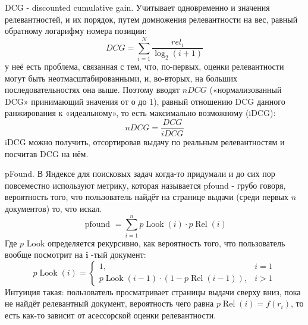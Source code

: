 DCG - discounted cumulative gain. Учитывает одновременно и значения релевантностей, и их порядок, путем домножения
релевантности на вес, равный обратному логарифму номера позиции:
$$
D C G=\sum_{i=1}^{N} \frac{r e l_{i}}{\log _{2}(i+1)}
$$
у неё есть проблема, связанная с тем, что, по-первых, оценки релевантности могут быть неотмасштабированными, и, во-вторых, на больших последовательностях она выше.
Поэтому вводят $n D C G$ («нормализованный DCG» принимающий значения от о до 1), равный отношению DCG данного
ранжирования к «идеальному», то есть максимально возможному (iDCG):
$$
n D C G=\frac{D C G}{i D C G}
$$
iDCG можно получить, отсортировав выдачу по реальным релевантностям и посчитав DCG на нём.

pFound. В Яндексе для поисковых задач когда-то придумали и до сих пор повсеместно используют метрику, которая называется pfound - грубо говоря, вероятность того, что пользователь найдёт на странице выдачи (среди первых $n$ документов) то, что искал.
$$
\text { pfound }=\sum_{i=1}^{n} p \operatorname{Look}(i) \cdot p \operatorname{Rel}(i)
$$
Где $p$ Look определяется рекурсивно, как вероятность того, что пользователь вообще посмотрит на $\boldsymbol{i}$ -тый документ:
$$
p \operatorname{Look}(i)=\left\{\begin{array}{ll}
1, & i=1 \\
p \operatorname{Look}(i-1) \cdot(1-p \operatorname{Rel}(i-1)), & i>1
\end{array}\right.
$$
Интуиция такая: пользователь просматривает страницы выдачи сверху вниз, пока не найдёт релевантный документ, вероятность чего равна $p \operatorname{Rel}(i)=f\left(r_{i}\right)$, то есть как-то зависит от асессорской оценки релевантности.